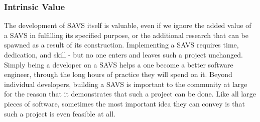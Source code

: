 \subsubsection{Intrinsic Value}

The development of SAVS itself is valuable, even if we ignore the
added value of a SAVS in fulfilling its specified purpose, or the
additional research that can be spawned as a result of its
construction.  Implementing a SAVS requires time, dedication, and
skill - but no one enters and leaves such a project unchanged. Simply
being a developer on a SAVS helps a one become a better software
engineer, through the long hours of practice they will spend on
it. Beyond individual developers, building a SAVS is important to the
community at large for the reason that it demonstrates that
such a project can be done. Like all large pieces of software,
sometimes the most important idea they can convey is that such a
project is even feasible at all.

